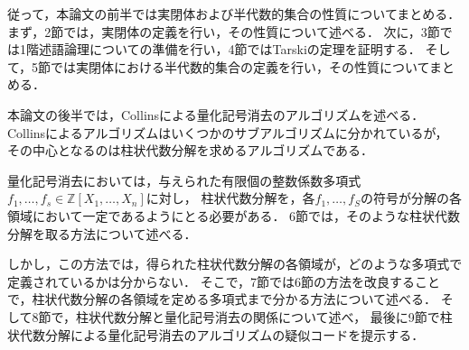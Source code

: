 \documentclass[uplatex, dvipdfmx]{jsarticle}
\theoremstyle{definition}
\begin{document}
従って，本論文の前半では実閉体および半代数的集合の性質についてまとめる．
まず，2節では，実閉体の定義を行い，その性質について述べる．
次に，3節では1階述語論理についての準備を行い，4節ではTarskiの定理を証明する．
そして，5節では実閉体における半代数的集合の定義を行い，その性質についてまとめる．

本論文の後半では，Collinsによる量化記号消去のアルゴリズムを述べる．
Collinsによるアルゴリズムはいくつかのサブアルゴリズムに分かれているが，
その中心となるのは柱状代数分解を求めるアルゴリズムである．

量化記号消去においては，与えられた有限個の整数係数多項式$f_1, \dots, f_s \in \mathbb{Z}[X_1, \dots, X_n]$に対し，
柱状代数分解を，各$f_1, \dots, f_S$の符号が分解の各領域において一定であるようにとる必要がある．
6節では，そのような柱状代数分解を取る方法について述べる．

しかし，この方法では，得られた柱状代数分解の各領域が，どのような多項式で定義されているかは分からない．
そこで，7節では6節の方法を改良することで，柱状代数分解の各領域を定める多項式まで分かる方法について述べる．
そして8節で，柱状代数分解と量化記号消去の関係について述べ，
最後に9節で柱状代数分解による量化記号消去のアルゴリズムの疑似コードを提示する．



\end{document}
